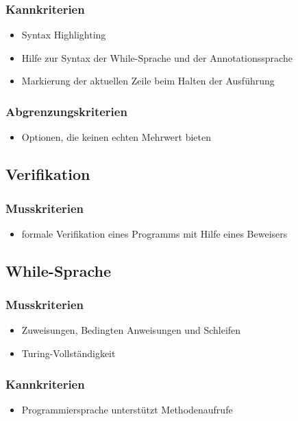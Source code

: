 \documentclass[a4paper,10pt]{article}
\begin{document}
\subsubsection{Kannkriterien}
\begin{itemize}
  \item Syntax Highlighting
  \item Hilfe zur Syntax der While-Sprache und der Annotationssprache
  \item Markierung der aktuellen Zeile beim Halten der Ausf\"{u}hrung
\end{itemize}
\subsubsection{Abgrenzungskriterien}
\begin{itemize}
  \item Optionen, die keinen echten Mehrwert bieten
\end{itemize}

\subsection{Verifikation}
\subsubsection{Musskriterien}
\begin{itemize}
  \item formale Verifikation eines Programms mit Hilfe eines Beweisers
\end{itemize}

\subsection{While-Sprache}
\subsubsection{Musskriterien}
\begin{itemize}
  \item Zuweisungen, Bedingten Anweisungen und Schleifen
  \item Turing-Vollständigkeit
\end{itemize}
\subsubsection{Kannkriterien}
\begin{itemize}
  \item Programmiersprache unterst\"{u}tzt Methodenaufrufe
\end{itemize}
\end{document}

